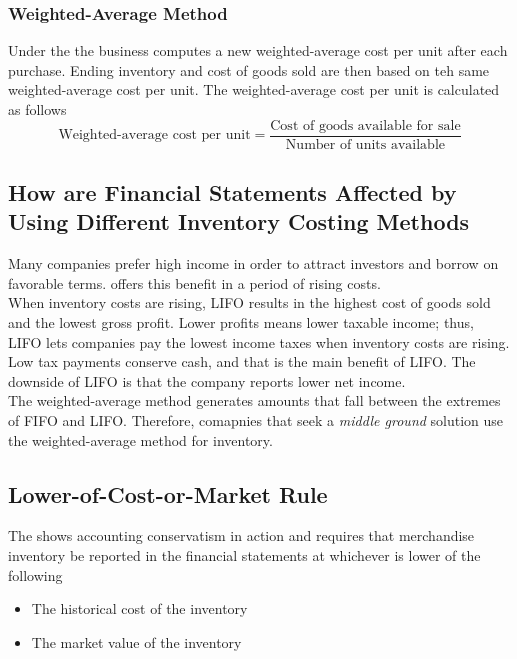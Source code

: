 \documentclass{article}
\begin{document}
\subsubsection{Weighted-Average Method}

Under the  the business computes a new weighted-average cost per unit after each purchase. Ending inventory and cost of goods sold are then based on teh same weighted-average cost per unit. The weighted-average cost per unit is calculated as follows $$\textrm{Weighted-average cost per unit} = \frac{\textrm{Cost of goods available for sale}}{\textrm{Number of units available}}$$ 

\subsection{How are Financial Statements Affected by Using Different Inventory Costing Methods}

Many companies prefer high income in order to attract investors and borrow on favorable terms.  offers this benefit in a period of rising costs. \\ 

When inventory costs are rising, LIFO results in the highest cost of goods sold and the lowest gross profit. Lower profits means lower taxable income; thus, LIFO lets companies pay the lowest income taxes when inventory costs are rising. Low tax payments conserve cash, and that is the main benefit of LIFO. The downside of LIFO is that the company reports lower net income. \\ 

The weighted-average method generates amounts that fall between the extremes of FIFO and LIFO. Therefore, comapnies that seek a \emph{middle ground} solution use the weighted-average method for inventory. 

\subsection{Lower-of-Cost-or-Market Rule}

The  shows accounting conservatism in action and requires that merchandise inventory be reported in the financial statements at whichever is lower of the following 
\begin{itemize}
  \item The historical cost of the inventory 
  \item The market value of the inventory
\end{itemize}
\end{document}
